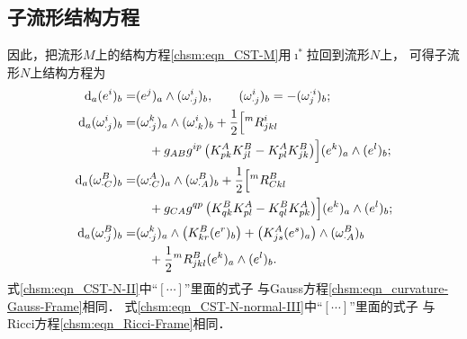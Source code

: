 \subsection{子流形结构方程}
因此，把流形$M$上的结构方程\eqref{chsm:eqn_CST-M}用$\imath^*$拉回到流形$N$上，
可得子流形$N$上结构方程为 %
\begin{subequations}\label{chsm:eqn_CST-N-Nb}
    \begin{align}
        {\rm d}_a (e^i)_b =& (e^j)_a \wedge (\omega _{\cdot j}^i)_b ,
        \qquad (\omega _{\cdot j}^i)_b =-(\omega _{j}^{\cdot i})_b ; \label{chsm:eqn_CST-N-I} \\
        {\rm d}_a ( \omega _{\cdot j} ^i  )_b  =&  ( \omega _{\cdot j}^k )_a  \wedge ( \omega _{\cdot k}^i )_b
        + \frac{1}{2}\Bigl[{}^{m}R_{jkl}^i    \notag \\
        &\quad + g_{A B} g^{ip}
        \left(K_{pk}^A K^{B}_{jl} -  K_{pl}^A K^{B}_{jk}\right) \Bigr]
        (e^k)_a \wedge (e^l)_b ; \label{chsm:eqn_CST-N-II} \\
        {\rm d}_a ( \omega _{\cdot C} ^B  )_b  =&
        ( \omega _{\cdot C}^A )_a  \wedge ( \omega _{\cdot A}^B )_b 
        + \frac{1}{2}\Bigl[ {}^{m}R_{C kl}^B  \notag\\
        &\quad  +g_{C A} g^{qp}
        \left(  K^{B}_{qk} K_{pl}^A - K^{B}_{ql} K_{pk}^A  \right)  \Bigr]
        (e^k)_a \wedge (e^l)_b ;  \label{chsm:eqn_CST-N-normal-III}  \\
        {\rm d}_a ( \omega _{\cdot j} ^B  )_b  =&
        ( \omega _{\cdot j}^k )_a \wedge \bigl(K^{B}_{kr}(e^r)_b\bigr)
        + \bigl(K^{A}_{js}(e^s)_a\bigr)  \wedge ( \omega _{\cdot A}^B )_b \notag \\
        &\quad  + \frac{1}{2}{}^{m}R_{ jkl}^B  (e^k)_a \wedge (e^l)_b  . \label{chsm:eqn_CST-N-normal-IV}
    \end{align}
\end{subequations} %
式\eqref{chsm:eqn_CST-N-II}中“$[\cdots]$”里面的式子
与Gauss方程\eqref{chsm:eqn_curvature-Gauss-Frame}相同．
式\eqref{chsm:eqn_CST-N-normal-III}中“$[\cdots]$”里面的式子
与Ricci方程\eqref{chsm:eqn_Ricci-Frame}相同．
%
